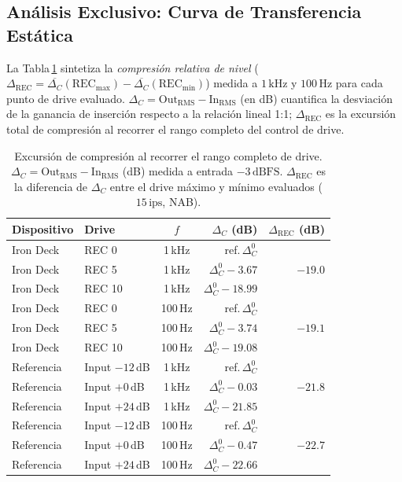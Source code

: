 \documentclass[10pt,conference]{IEEEtran}
\begin{document}
\subsection{Análisis Exclusivo: Curva de Transferencia Estática}
\label{sec:transferencia}

La Tabla\,\ref{tab:transferencia} sintetiza la \emph{compresión relativa de nivel}
($\Delta_{\text{REC}} = \overline{\Delta_C}(\text{REC}_{\text{max}}) -
\overline{\Delta_C}(\text{REC}_{\text{min}})$) medida a $1\,\text{kHz}$ y $100\,\text{Hz}$
para cada punto de drive evaluado. $\Delta_C = \text{Out}_{\text{RMS}} -
\text{In}_{\text{RMS}}$ (en dB) cuantifica la desviación de la ganancia de inserción
respecto a la relación lineal 1:1; $\Delta_{\text{REC}}$ es la excursión total de compresión
al recorrer el rango completo del control de drive.

\begin{table}[htbp]
\caption{Excursión de compresión al recorrer el rango completo de drive.
$\Delta_C = \text{Out}_\text{RMS} - \text{In}_\text{RMS}$ (dB) medida a entrada
$-3\,\text{dBFS}$. $\Delta_\text{REC}$ es la diferencia de $\Delta_C$ entre el
drive máximo y mínimo evaluados ($15\,\text{ips}$, NAB).}
\label{tab:transferencia}
\centering
\small
\begin{tabular}{llcrr}
\toprule
Dispositivo & Drive & $f$ & $\Delta_C$ (dB) & $\Delta_\text{REC}$ (dB) \\
\midrule
Iron Deck & REC 0  & 1\,kHz & ref.\,$\Delta_C^0$      & \multirow{3}{*}{$-19.0$} \\
Iron Deck & REC 5  & 1\,kHz & $\Delta_C^0 - 3.67$  & \\
Iron Deck & REC 10 & 1\,kHz & $\Delta_C^0 - 18.99$ & \\
\midrule
Iron Deck & REC 0  & 100\,Hz & ref.\,$\Delta_C^0$      & \multirow{3}{*}{$-19.1$} \\
Iron Deck & REC 5  & 100\,Hz & $\Delta_C^0 - 3.74$  & \\
Iron Deck & REC 10 & 100\,Hz & $\Delta_C^0 - 19.08$ & \\
\midrule
Referencia & Input $-12$\,dB & 1\,kHz  & ref.\,$\Delta_C^0$      & \multirow{3}{*}{$-21.8$} \\
Referencia & Input $+0$\,dB  & 1\,kHz  & $\Delta_C^0 - 0.03$  & \\
Referencia & Input $+24$\,dB & 1\,kHz  & $\Delta_C^0 - 21.85$ & \\
\midrule
Referencia & Input $-12$\,dB & 100\,Hz & ref.\,$\Delta_C^0$      & \multirow{3}{*}{$-22.7$} \\
Referencia & Input $+0$\,dB  & 100\,Hz & $\Delta_C^0 - 0.47$  & \\
Referencia & Input $+24$\,dB & 100\,Hz & $\Delta_C^0 - 22.66$ & \\
\bottomrule
\end{tabular}
\end{table}
\end{document}
